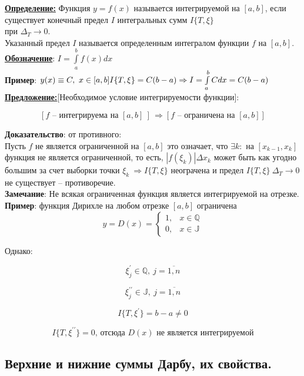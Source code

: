 \documentclass[a4paper,12pt]{article} %
\begin{document}
\underline{\textbf{Определение:}} Функция $y = f(x)$ называется интегрируемой на $[a,b]$, если существует конечный предел $I$ интегральных сумм $I\{T,\xi\}$\\ при $\Delta_T \longrightarrow 0$.\\
Указанный предел $I$ называется определенным интегралом функции $f$ на $[a,b]$.\\

\underline{\textbf{Обозначение}}: $I = \int\limits_{a}^{b} {f(x)dx}$\\

\textbf{Пример}: $y(x)\equiv C,~x\in[a,b]\\
I\{T,\xi\} = C(b-a) \Rightarrow I = \int\limits_{a}^{b} {Cdx} = C(b-a)$\\

\underline{\textbf{Предложение:}}[Необходимое условие интегрируемости функции]:

\[ [f \text{ -- интегрируема на }[a,b]~] \, \Rightarrow[ f \text{ -- ограничена на }[a,b] ] \]

\textbf{Доказательство}: от противного:
\\
Пусть $f$ не является ограниченной на $[a,b]$ это означает, что $\exists k:$ на $[x_{k-1},x_k]$
функция не является ограниченной, то есть, $|f(\xi_k)|\Delta x_k$ может быть как угодно большим за счет выборки точки $\xi_k~\Rightarrow I\{T,\xi\}$ неограчена и предел $I\{T,\xi\}~\Delta_T\rightarrow 0$ не существует -- противоречие.\\

\textbf{Замечание}: Не всякая ограниченная функция является интегрируемой на отрезке.\\

\textbf{Пример}: функция Дирихле на любом отрезке $[a,b]$ ограничена
$$y=D(x)=\left\{\begin{array}{ll}
1, & x \in \mathbb{Q} \\
0, & x \in \mathbb{J}
\end{array}\right.$$

Однако:

$$\xi_j^{\prime} \in \mathbb{Q},~j = \overline{1,n}$$

$$\xi_j^{\prime \prime} \in \mathbb{J},~j = \overline{1,n}$$

$$I\{T,\xi^{\prime}\} = b-a\neq 0$$

$$I\{T,\xi^{\prime \prime}\} = 0 \text{, отсюда } D(x) \text{ не является интегрируемой}$$

\subsection{Верхние и нижние суммы Дарбу, их свойства.}
\end{document}
